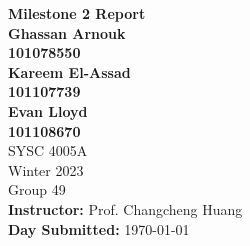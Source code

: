 \documentclass[final, hidelinks, 12pt, a4paper]{article}
\begin{document}
    \begin{titlepage}
        \begin{center}
        	\vspace{1cm}
            {\LARGE{\bfseries Milestone 2 Report}}\\

            \vspace{1.5cm}
            {\large {\bfseries Ghassan Arnouk}}\\
            {\large {\bfseries 101078550}}\\
            \vspace{0.2cm}
            {\large {\bfseries Kareem El-Assad}}\\
            {\large {\bfseries 101107739}}\\
            \vspace{0.2cm}
            {\large {\bfseries Evan Lloyd}}\\
            {\large {\bfseries 101108670}}\\
            
            \vspace{1cm}
            {\large SYSC 4005A}\\
            {\large Winter 2023}\\
            {\large Group 49}\\


            \vspace{2cm}
            {\bfseries Instructor:} Prof. Changcheng Huang\\

            \vspace{1cm}
            {\bfseries Day Submitted:} \today\\
    	\end{center}
    \end{titlepage} 


    \tableofcontents
    \clearpage

    \listoftables
    \clearpage
    
    \listoffigures
    \clearpage

    \listoflistings
    \clearpage
\end{document}
